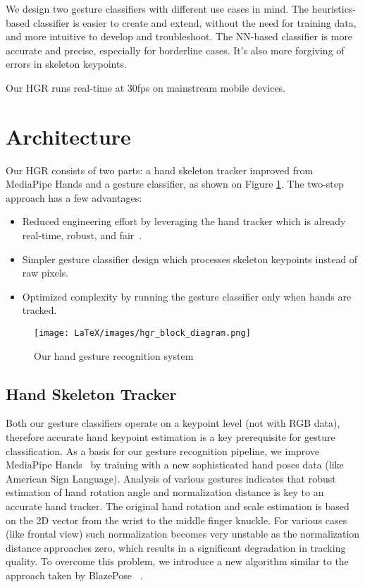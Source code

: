 \documentclass[10pt,twocolumn,letterpaper]{article}
\begin{document}
We design two gesture classifiers with different use cases in mind. The heuristics-based classifier is easier to create and extend, without the need for training data, and more intuitive to develop and troubleshoot. The NN-based classifier is more accurate and precise, especially for borderline cases. It’s also more forgiving of errors in skeleton keypoints.

Our HGR runs real-time at 30fps on mainstream mobile devices. 

\section{Architecture}

Our HGR consists of two parts: a hand skeleton tracker improved from MediaPipe Hands and a gesture classifier, as shown on Figure \ref{fig:architecture}. The two-step approach has a few advantages:
\begin{itemize}
    \item Reduced engineering effort by leveraging the hand tracker which is already real-time, robust, and fair~\cite{hands_model_card}.
    \item Simpler gesture classifier design which processes skeleton keypoints instead of raw pixels.
    \item Optimized complexity by running the gesture classifier only when hands are tracked.
\end{itemize}

\begin{figure}
\begin{center}
   \texttt{[image: LaTeX/images/hgr\_block\_diagram.png]}
\end{center}
   \caption{Our hand gesture recognition system}
\label{fig:architecture}
\end{figure}

\subsection{Hand Skeleton Tracker}\label{section:hand_skeleton_tracker}

Both our gesture classifiers operate on a keypoint level (not with RGB data), therefore accurate hand keypoint estimation is a key prerequisite for gesture classification. As a basis for our gesture recognition pipeline, we improve MediaPipe Hands~\cite{mediapipe_hands} by training with a new sophisticated hand poses data (like American Sign Language). Analysis of various gestures indicates that robust estimation of hand rotation angle and normalization distance is key to an accurate hand tracker. The original hand rotation and scale estimation is based on the 2D vector from the wrist to the middle finger knuckle. For various cases (like frontal view) such normalization becomes very unstable as the normalization distance approaches zero, which results in a significant degradation in tracking quality. To overcome this problem, we introduce a new algorithm similar to the approach taken by BlazePose ~\cite{blazepose2020}. 
\end{document}
